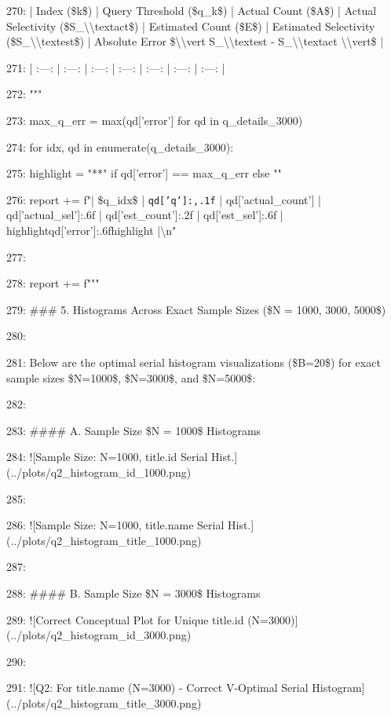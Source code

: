 \documentclass[11pt,a4paper]{article}
\begin{document}
270: | Index (\$k\$) | Query Threshold (\$q\_k\$) | Actual Count (\$A\$) | Actual Selectivity (\$S\_{{\textbackslash{}\textbackslash{}text{{act}}}}\$) | Estimated Count (\$E\$) | Estimated Selectivity (\$S\_{{\textbackslash{}\textbackslash{}text{{est}}}}\$) | Absolute Error \$\textbackslash{}\textbackslash{}vert S\_{{\textbackslash{}\textbackslash{}text{{est}}}} - S\_{{\textbackslash{}\textbackslash{}text{{act}}}} \textbackslash{}\textbackslash{}vert\$ |

271: | :---: | :---: | :---: | :---: | :---: | :---: | :---: |

272: """

273:     max\_q\_err = max(qd['error'] for qd in q\_details\_3000)

274:     for idx, qd in enumerate(q\_details\_3000):

275:         highlight = "**" if qd['error'] == max\_q\_err else ""

276:         report += f"| \$q\_{{{idx}}}\$ | \texttt{{qd['q']:,.1f}} | {qd['actual\_count']} | {qd['actual\_sel']:.6f} | {qd['est\_count']:.2f} | {qd['est\_sel']:.6f} | {highlight}{qd['error']:.6f}{highlight} |\textbackslash{}n"

277:

278:     report += f"""

279: \#\#\# 5. Histograms Across Exact Sample Sizes (\$N = 1000, 3000, 5000\$)

280:

281: Below are the optimal serial histogram visualizations (\$B=20\$) for exact sample sizes \$N=1000\$, \$N=3000\$, and \$N=5000\$:

282:

283: \#\#\#\# A. Sample Size \$N = 1000\$ Histograms

284: ![Sample Size: N=1000, title.id Serial Hist.](../plots/q2\_histogram\_id\_1000.png)

285:

286: ![Sample Size: N=1000, title.name Serial Hist.](../plots/q2\_histogram\_title\_1000.png)

287:

288: \#\#\#\# B. Sample Size \$N = 3000\$ Histograms

289: ![Correct Conceptual Plot for Unique title.id (N=3000)](../plots/q2\_histogram\_id\_3000.png)

290:

291: ![Q2: For title.name (N=3000) - Correct V-Optimal Serial Histogram](../plots/q2\_histogram\_title\_3000.png)
\end{document}

